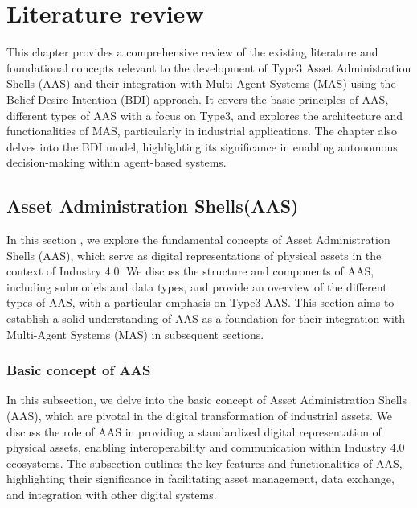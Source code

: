 \section{Literature review}

\begin{tcolorbox}[colback=black!5!white,colframe=black!75!black,
  title=About this chapter]
  This chapter provides a comprehensive review of the existing literature and foundational concepts relevant to the development of Type3 Asset Administration Shells (AAS) and their integration with Multi-Agent Systems (MAS) using the Belief-Desire-Intention (BDI) approach. It covers the basic principles of AAS, different types of AAS with a focus on Type3, and explores the architecture and functionalities of MAS, particularly in industrial applications. The chapter also delves into the BDI model, highlighting its significance in enabling autonomous decision-making within agent-based systems.
  
\end{tcolorbox}

\subsection{Asset Administration Shells(AAS)}
\begin{tcolorbox}[colback=black!5!white,colframe=black!75!black,
  title=About AAS]
  In this section , we explore the fundamental concepts of Asset Administration Shells (AAS), which serve as digital representations of physical assets in the context of Industry 4.0. We discuss the structure and components of AAS, including submodels and data types, and provide an overview of the different types of AAS, with a particular emphasis on Type3 AAS. This section aims to establish a solid understanding of AAS as a foundation for their integration with Multi-Agent Systems (MAS) in subsequent sections.
\end{tcolorbox}

\subsubsection{Basic concept of AAS}
\begin{tcolorbox}[colback=black!5!white,colframe=black!75!black,
  title=About AAS Concept]
  In this subsection, we delve into the basic concept of Asset Administration Shells (AAS), which are pivotal in the digital transformation of industrial assets. We discuss the role of AAS in providing a standardized digital representation of physical assets, enabling interoperability and communication within Industry 4.0 ecosystems. The subsection outlines the key features and functionalities of AAS, highlighting their significance in facilitating asset management, data exchange, and integration with other digital systems.
\end{tcolorbox}

